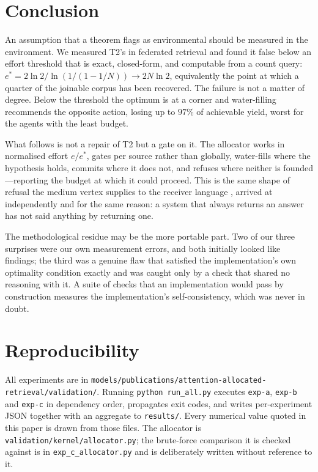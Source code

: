 \documentclass[11pt,twocolumn,a4paper]{article}
\theoremstyle{thmstyle}
\theoremstyle{definition}
\theoremstyle{remark}
\newcommand{\eff}{e}
\newcommand{\estar}{e^{*}}
\newcommand{\shk}[1]{\texttt{#1}}
\begin{document}
\section{Conclusion}
\label{sec:conclusion}

An assumption that a theorem flags as environmental should be measured in
the environment. We measured T2's in federated retrieval and found it
false below an effort threshold that is exact, closed-form, and
computable from a count query: $\estar=2\ln2/\ln(1/(1-1/N))\to 2N\ln2$,
equivalently the point at which a quarter of the joinable corpus has been
recovered. The failure is not a matter of degree. Below the threshold the
optimum is at a corner and water-filling recommends the opposite action,
losing up to $97\%$ of achievable yield, worst for the agents with the
least budget.

What follows is not a repair of T2 but a gate on it. The allocator works
in normalised effort $\eff/\estar$, gates per source rather than
globally, water-fills where the hypothesis holds, commits where it does
not, and refuses where neither is founded---reporting the budget at which
it could proceed. This is the same shape of refusal the medium vertex
supplies to the receiver language \citep{sachikonye2026medium}, arrived
at independently and for the same reason: a system that always returns an
answer has not said anything by returning one.

The methodological residue may be the more portable part. Two of our
three surprises were our own measurement errors, and both initially
looked like findings; the third was a genuine flaw that satisfied the
implementation's own optimality condition exactly and was caught only by
a check that shared no reasoning with it. A suite of checks that an
implementation would pass by construction measures the implementation's
self-consistency, which was never in doubt.

\section*{Reproducibility}

All experiments are in
\shk{models/publications/attention-allocated-retrieval/validation/}.
Running \shk{python run\_all.py} executes \texttt{exp-a}, \texttt{exp-b}
and \texttt{exp-c} in dependency order, propagates exit codes, and writes
per-experiment JSON together with an aggregate to \shk{results/}. Every
numerical value quoted in this paper is drawn from those files. The
allocator is \shk{validation/kernel/allocator.py}; the brute-force
comparison it is checked against is in \shk{exp\_c\_allocator.py} and is
deliberately written without reference to it.



\end{document}
